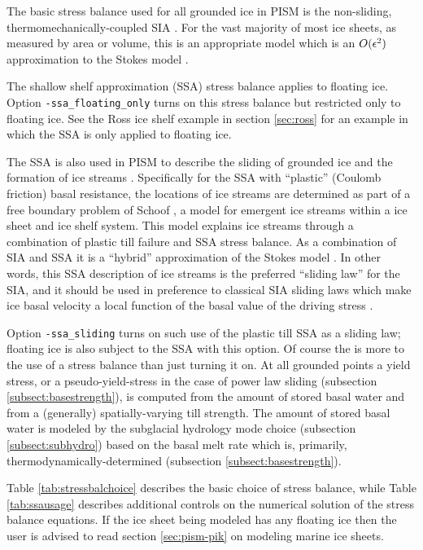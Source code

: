 The basic stress balance used for all grounded ice in PISM is the non-sliding, thermomechanically-coupled SIA \cite{BBL}.  For the vast majority of most ice sheets, as measured by area or volume, this is an appropriate model which is an $O(\epsilon^2)$ approximation to the Stokes model \cite{Fowler}.

The shallow shelf approximation (SSA) stress balance applies to floating ice.  Option \texttt{-ssa_floating_only} turns on this stress balance but restricted only to floating ice.  See the Ross ice shelf example in section \ref{sec:ross} for an example in which the SSA is only applied to floating ice.

The SSA is also used in PISM to describe the sliding of grounded ice and the formation of ice streams \cite{BBssasliding}.  Specifically for the SSA with ``plastic'' (Coulomb friction) basal resistance, the locations of ice streams are determined as part of a free boundary problem of Schoof \cite{SchoofStream}, a model for emergent ice streams within a ice sheet and ice shelf system.  This model explains ice streams through a combination of plastic till failure and SSA stress balance.  As a combination of SIA and SSA it is a ``hybrid'' approximation of the Stokes model \cite{BBssasliding,Winkelmannetal2011}.  In other words, this SSA description of ice streams is the preferred ``sliding law'' for the SIA, and it should be used in preference to classical SIA sliding laws which make ice basal velocity a local function of the basal value of the driving stress \cite{BBssasliding}.

Option \texttt{-ssa_sliding} turns on such use of the plastic till SSA as a sliding law; floating ice is also subject to the SSA with this option.  Of course the is more to the use of a stress balance than just turning it on.  At all grounded points a yield stress, or a pseudo-yield-stress in the case of power law sliding (subsection \ref{subsect:basestrength}), is computed from the amount of stored basal water and from a (generally) spatially-varying till strength.  The amount of stored basal water is modeled by the subglacial hydrology mode choice (subsection \ref{subsect:subhydro}) based on the basal melt rate which is, primarily, thermodynamically-determined (subsection \ref{subsect:basestrength}).

Table \ref{tab:stressbalchoice} describes the basic choice of stress balance, while Table \ref{tab:ssausage} describes additional controls on the numerical solution of the stress balance equations.  If the ice sheet being modeled has any floating ice then the user is advised to read section \ref{sec:pism-pik} on modeling marine ice sheets.

